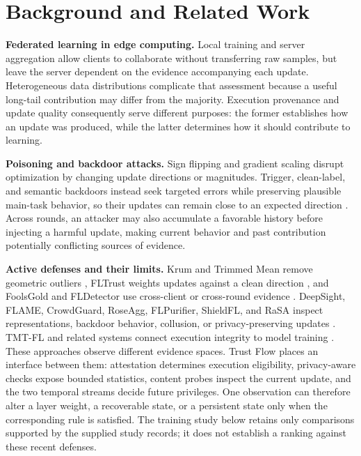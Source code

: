 \documentclass[conference,compsoc]{IEEEtran}
\begin{document}
\section{Background and Related Work}

\textbf{Federated learning in edge computing.} Local training and server aggregation allow clients to collaborate without transferring raw samples, but leave the server dependent on the evidence accompanying each update. Heterogeneous data distributions complicate that assessment because a useful long-tail contribution may differ from the majority. Execution provenance and update quality consequently serve different purposes: the former establishes how an update was produced, while the latter determines how it should contribute to learning.

\textbf{Poisoning and backdoor attacks.} Sign flipping and gradient scaling disrupt optimization by changing update directions or magnitudes. Trigger, clean-label, and semantic backdoors instead seek targeted errors while preserving plausible main-task behavior, so their updates can remain close to an expected direction \cite{bagdasaryan2020backdoor,wang2019neuralcleanse}. Across rounds, an attacker may also accumulate a favorable history before injecting a harmful update, making current behavior and past contribution potentially conflicting sources of evidence.

\textbf{Active defenses and their limits.} Krum and Trimmed Mean remove geometric outliers \cite{blanchard2017krum,yin2018byzantine}, FLTrust weights updates against a clean direction \cite{cao2021fltrust}, and FoolsGold and FLDetector use cross-client or cross-round evidence \cite{fung2020foolsgold,fldetector2022}. DeepSight, FLAME, CrowdGuard, RoseAgg, FLPurifier, ShieldFL, and RaSA inspect representations, backdoor behavior, collusion, or privacy-preserving updates \cite{deepsight2022,flame2022,crowdguard2024,roseagg,flpurifier,shieldfl,wang2025rasa}. TMT-FL and related systems connect execution integrity to model training \cite{lu2025tmt}. These approaches observe different evidence spaces. Trust Flow places an interface between them: attestation determines execution eligibility, privacy-aware checks expose bounded statistics, content probes inspect the current update, and the two temporal streams decide future privileges. One observation can therefore alter a layer weight, a recoverable state, or a persistent state only when the corresponding rule is satisfied. The training study below retains only comparisons supported by the supplied study records; it does not establish a ranking against these recent defenses.
\end{document}
